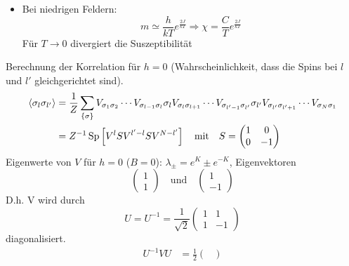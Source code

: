 \begin{enumerate}[A)]
\begin{itemize}
        \item Bei niedrigen Feldern:
        \begin{equation}
            m \simeq \frac{h}{k T} e^{\frac{2 J}{k T}} \Rightarrow \chi = \frac{C}{T} e^{\frac{2J}{k T}}
        \end{equation}
        Für $T \to 0$ divergiert die Suszeptibilität
    \end{itemize}
    Berechnung der Korrelation für $h=0$ (Wahrscheinlichkeit, dass die Spins bei $l$ und $l'$ gleichgerichtet sind).
    \begin{equation}
        \begin{split}
            \left\langle\sigma_l \sigma_{l'}\right\rangle &= \frac{1}{Z} \sum_{\left\{ \sigma \right\}} V_{\sigma_1 \sigma_2} \cdots V_{\sigma_{l-1} \sigma_l} \sigma_l V_{\sigma_l \sigma_{l+1}} \cdots V_{\sigma_{l'-1} \sigma_{l'}} \sigma_{l'} V_{\sigma_{l'} \sigma_{l'+1}} \cdots V_{\sigma_N \sigma_1} \\
            &= Z^{-1} \operatorname{Sp} \left[ V^l S V^{l'-l} S V^{N-l'} \right] \quad \text{mit} \quad S =
            \begin{pmatrix}
                1 & 0 \\
                0 & - 1
            \end{pmatrix}
        \end{split}
    \end{equation}
    Eigenwerte von $V$ für $h=0$ ($B=0$): $\lambda_\pm = e^K \pm e^{-K}$, Eigenvektoren
    \begin{equation}
        \begin{pmatrix}
            1 \\ 1
        \end{pmatrix} \quad \text{und} \quad
        \begin{pmatrix}
            1 \\ -1
        \end{pmatrix}
    \end{equation}
    D.h. V wird durch
    \begin{equation}
        U = U^{-1} = \frac{1}{\sqrt{2}}
        \begin{pmatrix}
            1 & 1 \\
            1 & -1
        \end{pmatrix}
    \end{equation}
    diagonalisiert.
    \begin{equation}
        \begin{split}
            U^{-1} V U &= \frac{1}{2}
            \begin{pmatrix}

\end{pmatrix}
\end{split}
\end{equation}
\end{enumerate}
